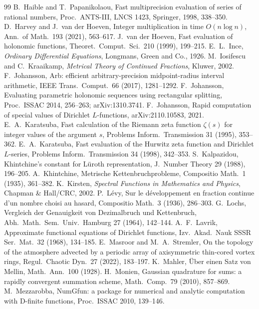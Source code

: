 \documentclass[11pt]{amsart}
\theoremstyle{definition}
\theoremstyle{remark}
\begin{document}
\begin{thebibliography}{99}
 B.~Haible and T.~Papanikolaou, Fast multiprecision evaluation of series of rational numbers, Proc.\ ANTS-III, LNCS 1423, Springer, 1998, 338--350.
 D.~Harvey and J.~van der Hoeven, Integer multiplication in time $O(n\log n)$, Ann.\ of Math.\ 193 (2021), 563--617.
 J.~van der Hoeven, Fast evaluation of holonomic functions, Theoret.\ Comput.\ Sci.\ 210 (1999), 199--215.
 E.~L.~Ince, \emph{Ordinary Differential Equations}, Longmans, Green and Co., 1926.
 M.~Iosifescu and C.~Kraaikamp, \emph{Metrical Theory of Continued Fractions}, Kluwer, 2002.
 F.~Johansson, Arb: efficient arbitrary-precision midpoint-radius interval arithmetic, IEEE Trans.\ Comput.\ 66 (2017), 1281--1292.
 F.~Johansson, Evaluating parametric holonomic sequences using rectangular splitting, Proc.\ ISSAC 2014, 256--263; arXiv:1310.3741.
 F.~Johansson, Rapid computation of special values of Dirichlet $L$-functions, arXiv:2110.10583, 2021.
 E.~A.~Karatsuba, Fast calculation of the Riemann zeta function $\zeta(s)$ for integer values of the argument $s$, Problems Inform.\ Transmission 31 (1995), 353--362.
 E.~A.~Karatsuba, Fast evaluation of the Hurwitz zeta function and Dirichlet $L$-series, Problems Inform.\ Transmission 34 (1998), 342--353.
 S.~Kalpazidou, Khintchine's constant for L\"uroth representation, J.\ Number Theory 29 (1988), 196--205.
 A.~Khintchine, Metrische Kettenbruchprobleme, Compositio Math.\ 1 (1935), 361--382.
 K.~Kirsten, \emph{Spectral Functions in Mathematics and Physics}, Chapman \& Hall/CRC, 2002.
 P.~L\'evy, Sur le d\'eveloppement en fraction continue d'un nombre choisi au hasard, Compositio
Math.\ 3 (1936), 286--303.
 G.~Lochs, Vergleich der Genauigkeit von Dezimalbruch und Kettenbruch, Abh.\ Math.\ Sem.\ Univ.\
Hamburg 27 (1964), 142--144.
 A.~F.~Lavrik, Approximate functional equations of Dirichlet functions, Izv.\ Akad.\ Nauk SSSR Ser.\ Mat.\ 32 (1968), 134--185.
\bibitem{MS22} E.~Masroor and M.~A.~Stremler, On the topology of the atmosphere advected by a periodic array of axisymmetric thin-cored vortex rings, Regul.\ Chaotic Dyn.\ 27 (2022), 183--197.
\bibitem{Mah28} K.~Mahler, \"Uber einen Satz von Mellin, Math.\ Ann.\ 100 (1928).
\bibitem{Mon10} H.~Monien, Gaussian quadrature for sums: a rapidly convergent summation scheme, Math.\ Comp.\ 79 (2010), 857--869.
\bibitem{Mez10} M.~Mezzarobba, NumGfun: a package for numerical and analytic computation with D-finite functions, Proc.\ ISSAC 2010, 139--146.

\end{thebibliography}
\end{document}
